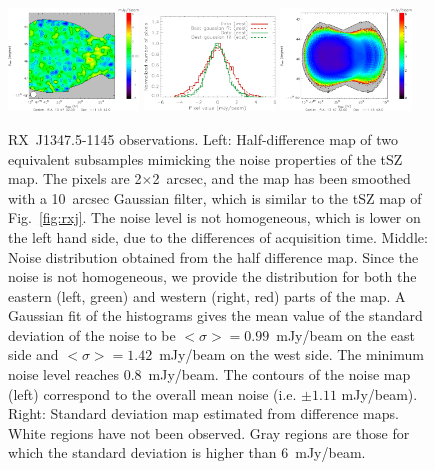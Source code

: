 	\begin{figure}
	\centering
	\includegraphics[width=0.31\textwidth]{Figure/JK_smallFOV}
	\hspace*{0.3cm}
	\includegraphics[width=0.31\textwidth]{Figure/histo_jk_smallFOV2}
	\hspace*{0.3cm}
	\includegraphics[width=0.31\textwidth]{Figure/RXJ1347-1145_map_rms}
	\caption{\mbox{RX~J1347.5-1145} observations. Left: Half-difference map of two equivalent subsamples mimicking the noise properties of the tSZ map. The pixels are 2$\times$2~arcsec, and the map has been smoothed with a 10~arcsec Gaussian filter, which is similar to the tSZ map of Fig.~\ref{fig:rxj}. The noise level is not homogeneous, which is lower on the left hand side, due to the differences of acquisition time. Middle: Noise distribution obtained from the half difference map. Since the noise is not homogeneous, we provide the distribution for both the eastern (left, green) and western (right, red) parts of the map. A Gaussian fit of the histograms gives the mean value of the standard deviation of the noise to be $<\sigma> = 0.99$~mJy/beam on the east side and $<\sigma> = 1.42$~mJy/beam on the west side. The minimum noise level reaches 0.8~mJy/beam. The contours of the noise map (left) correspond to the overall mean noise (i.e.  $\pm 1.11$ mJy/beam). Right: Standard deviation map estimated from difference maps. White regions have not been observed. Gray regions are those for which the standard deviation is higher than 6~mJy/beam.}
        \label{fig:rxj_jk}
	\end{figure}
	
